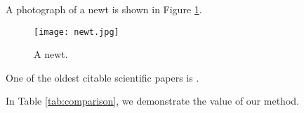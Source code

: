 A photograph of a newt is shown in Figure \ref{fig:newt}.
\begin{figure}[!h]
    \texttt{[image: newt.jpg]}
    \label{fig:newt}
    \caption{A newt.}
\end{figure}

One of the oldest citable scientific papers is \cite{van1677concerning}.


In Table \ref{tab:comparison}, we demonstrate the value of our method.

